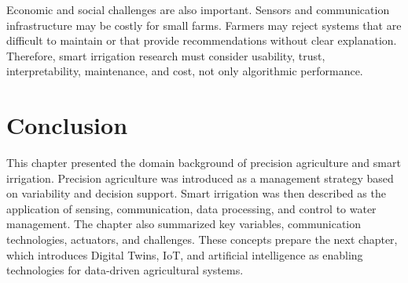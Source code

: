 Economic and social challenges are also important. Sensors and communication infrastructure may be costly for small farms. Farmers may reject systems that are difficult to maintain or that provide recommendations without clear explanation. Therefore, smart irrigation research must consider usability, trust, interpretability, maintenance, and cost, not only algorithmic performance.

\section{Conclusion}

This chapter presented the domain background of precision agriculture and smart irrigation. Precision agriculture was introduced as a management strategy based on variability and decision support. Smart irrigation was then described as the application of sensing, communication, data processing, and control to water management. The chapter also summarized key variables, communication technologies, actuators, and challenges. These concepts prepare the next chapter, which introduces Digital Twins, IoT, and artificial intelligence as enabling technologies for data-driven agricultural systems.
